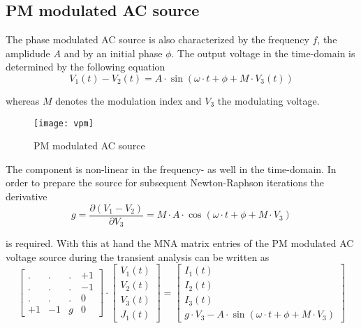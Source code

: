 \subsection{PM modulated AC source}

The phase modulated AC source is also characterized by the frequency
$f$, the amplidude $A$ and by an initial phase $\phi$.  The output
voltage in the time-domain is determined by the following equation
\begin{equation}
V_1\left(t\right) - V_2\left(t\right) = A\cdot\sin{\left(\omega\cdot t + \phi + M\cdot V_3\left(t\right)\right)}
\end{equation}

whereas $M$ denotes the modulation index and $V_3$ the modulating
voltage.

\begin{figure}[ht]
\begin{center}
\texttt{[image: vpm]}
\end{center}
\label{fig:VPM}
\caption{PM modulated AC source}
\end{figure}
\FloatBarrier

The component is non-linear in the frequency- as well in the
time-domain.  In order to prepare the source for subsequent
Newton-Raphson iterations the derivative
\begin{equation}
g = \dfrac{\partial \left(V_1 - V_2\right)}{\partial V_3} = M\cdot A\cdot\cos{\left(\omega\cdot t + \phi + M\cdot V_3\right)}
\end{equation}

is required.  With this at hand the MNA matrix entries of the PM
modulated AC voltage source during the transient analysis can be
written as
\begin{equation}
\begin{bmatrix}
. & . & . & +1\\
. & . & . & -1\\
. & . & . & 0\\
+1 & -1 & g & 0
\end{bmatrix}
\cdot
\begin{bmatrix}
V_1\left(t\right)\\
V_2\left(t\right)\\
V_3\left(t\right)\\
J_1\left(t\right)
\end{bmatrix}
=
\begin{bmatrix}
I_1\left(t\right)\\
I_2\left(t\right)\\
I_3\left(t\right)\\
g\cdot V_3 - A\cdot \sin{\left(\omega\cdot t + \phi + M\cdot V_3\right)}
\end{bmatrix}
\end{equation}

